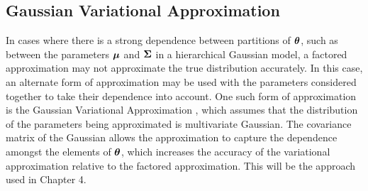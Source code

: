 





\subsection{Gaussian Variational Approximation}

In cases where there is a strong dependence between partitions of ${\boldsymbol \theta}$,
such as between the parameters ${\boldsymbol \mu}$ and ${\boldsymbol \Sigma}$ in a hierarchical Gaussian
model, a factored approximation may not approximate the true distribution
accurately. In this case, an alternate form of approximation may be used with
the parameters considered together to take their dependence into account. One
such form of approximation is the Gaussian Variational Approximation
\citep{Ormerod2012}, which assumes that the distribution of the parameters being
approximated is multivariate Gaussian. The covariance matrix of the Gaussian
allows the approximation to capture the dependence amongst the elements of
${\boldsymbol \theta}$, which increases the accuracy of the variational approximation
relative to the factored approximation. This will be the approach used in
Chapter 4.

